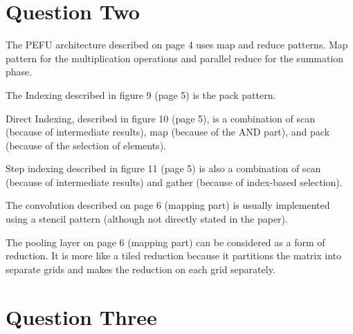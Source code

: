 \documentclass[12pt]{article}
\begin{document}
\newpage

\section{Question Two}

The PEFU architecture described on page 4 uses map and reduce patterns. Map pattern for the multiplication operations and parallel reduce for the summation phase.

The Indexing described in figure 9 (page 5) is the pack pattern.

Direct Indexing, described in figure 10 (page 5), is a combination of scan (because of intermediate results), map (because of the AND part), and pack (because of the selection of elements).

Step indexing described in figure 11 (page 5) is also a combination of scan (because of intermediate results) and gather (because of index-based selection).

The convolution described on page 6 (mapping part) is usually implemented using a stencil pattern (although not directly stated in the paper).

The pooling layer on page 6 (mapping part) can be considered as a form of reduction. It is more like a tiled reduction because it partitions the matrix into separate grids and makes the reduction on each grid separately.





\newpage



\section{Question Three}
\end{document}
